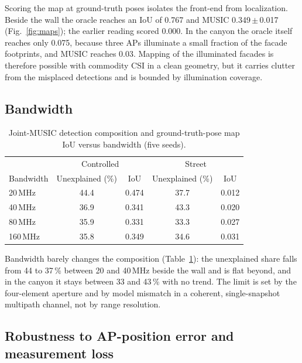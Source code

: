 \documentclass[preprint,12pt]{elsarticle}
\begin{document}
Scoring the map at ground-truth poses isolates the front-end from localization. Beside the wall
the oracle reaches an IoU of 0.767 and MUSIC 0.349\,$\pm$\,0.017 (Fig.~\ref{fig:maps}); the
earlier reading scored 0.000. In the canyon the oracle itself reaches only 0.075, because
three APs illuminate a small fraction of the facade footprints, and MUSIC reaches 0.03. Mapping of
the illuminated facades is therefore possible with commodity CSI in a clean geometry, but it
carries clutter from the misplaced detections and is bounded by illumination coverage.

\subsection{Bandwidth}\label{sec:bw}

\begin{table}[t]\centering\small
\caption{Joint-MUSIC detection composition and ground-truth-pose map IoU versus bandwidth
(five seeds).}
\label{tab:bw}
\begin{tabular}{@{}lcccc@{}}
\toprule
 & \multicolumn{2}{c}{Controlled} & \multicolumn{2}{c}{Street} \\
Bandwidth & Unexplained (\%) & IoU & Unexplained (\%) & IoU \\ \midrule
20\,MHz  & 44.4 & 0.474 & 37.7 & 0.012 \\
40\,MHz  & 36.9 & 0.341 & 43.3 & 0.020 \\
80\,MHz  & 35.9 & 0.331 & 33.3 & 0.027 \\
160\,MHz & 35.8 & 0.349 & 34.6 & 0.031 \\
\bottomrule
\end{tabular}
\end{table}

Bandwidth barely changes the composition (Table~\ref{tab:bw}): the unexplained share falls from
44 to 37\,\% between 20 and 40\,MHz beside the wall and is flat beyond, and in the canyon it stays
between 33 and 43\,\% with no trend. The limit is
set by the four-element aperture and by model mismatch in a coherent, single-snapshot multipath
channel, not by range resolution.

\subsection{Robustness to AP-position error and measurement loss}\label{sec:robust}
\end{document}
